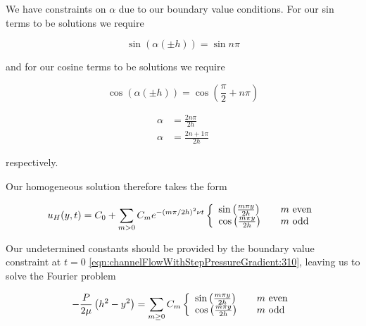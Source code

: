 We have constraints on $\alpha$ due to our boundary value conditions.  For our sin terms to be solutions we require

\begin{equation}\label{eqn:channelFlowWithStepPressureGradient:390}
\sin (\alpha (\pm h)) = \sin n \pi
\end{equation}

and for our cosine terms to be solutions we require

\begin{equation}\label{eqn:channelFlowWithStepPressureGradient:410}
\cos (\alpha (\pm h)) = \cos \left( \frac{\pi}{2} + n \pi \right)
\end{equation}

\begin{align}\label{eqn:channelFlowWithStepPressureGradient:430}
\alpha &= \frac{2 n \pi}{2 h} \\
\alpha &= \frac{2 n + 1 \pi}{2 h}
\end{align}

respectively.

Our homogeneous solution therefore takes the form

\begin{equation}\label{eqn:channelFlowWithStepPressureGradient:450}
u_H(y, t) = 
C_0 + \sum_{m > 0} C_m e^{ -(m \pi/2h)^2 \nu t } 
\left\{
\begin{array}{l l}
\sin \left( \frac{ m \pi y }{2 h} \right) & \quad \mbox{$m$ even} \\
\cos \left( \frac{ m \pi y }{2 h} \right) & \quad \mbox{$m$ odd} \\
\end{array}
\right.
\end{equation}

Our undetermined constants should be provided by the boundary value constraint at $t = 0$ \ref{eqn:channelFlowWithStepPressureGradient:310}, leaving us to solve the Fourier problem

\begin{equation}\label{eqn:channelFlowWithStepPressureGradient:470}
-\frac{P}{2 \mu} \left( h^2 - y^2 \right)
=
\sum_{m \ge 0} C_m 
\left\{
\begin{array}{l l}
\sin \left( \frac{ m \pi y }{2 h} \right) & \quad \mbox{$m$ even} \\
\cos \left( \frac{ m \pi y }{2 h} \right) & \quad \mbox{$m$ odd} \\
\end{array}
\right.
\end{equation}

